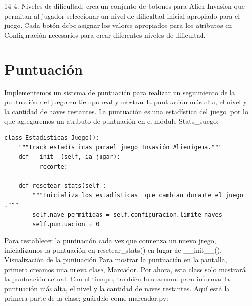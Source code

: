 14-4. Niveles de dificultad: crea un conjunto de botones para Alien Invasion que permitan al jugador seleccionar un nivel de dificultad inicial apropiado para el juego. Cada botón debe asignar los valores apropiados para los atributos en Configuración necesarios para crear diferentes niveles de dificultad.


\section{Puntuación} 

Implementemos un sistema de puntuación para realizar un seguimiento de la puntuación del juego en tiempo real y mostrar 
la puntuación más alta, el nivel y la cantidad de naves restantes. La puntuación es una estadística del juego, por lo que 
agregaremos un atributo de puntuación en el módulo  {\ttfamily Stats\_Juego}:



\hspace{-2.4cm}{\ttfamily \scriptsize stats}

\vspace{-0.2cm}
\hspace{-2.1cm}{\ttfamily \scriptsize \_juego.py}\vspace{-0.84cm}
\begin{lstlisting}	
class Estadisticas_Juego():
    """Track estadísticas parael juego Invasión Alienígena."""
    def __init__(self, ia_jugar):
        --recorte:
        
    def resetear_stats(self):
        """Inicializa los estadísticas  que cambian durante el juego .""" 
        self.nave_permitidas = self.configuracion.limite_naves
        self.puntuacion = 0
\end{lstlisting}

Para restablecer la puntuación cada vez que comienza un nuevo juego, inicializamos la puntuación en  {\ttfamily  resetear\_stats()}
en lugar de {\ttfamily \_\_init\_\_()}. Visualización de la puntuación Para mostrar la puntuación en la pantalla, primero creamos
 una nueva clase, Marcador. Por ahora, esta clase solo mostrará la puntuación actual. Con el tiempo, también lo
  usaremos para informar la puntuación más alta, el nivel y la cantidad de naves restantes. Aquí está la primera
   parte de la clase; guárdelo como marcador.py:



